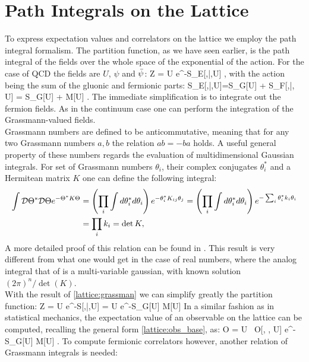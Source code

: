 \section{Path Integrals on the Lattice}
\label{sec:pathintegral}
To express expectation values and correlators on the lattice we employ the path integral formalism. The partition function, as we have seen earlier, is the path integral of the fields over the whole space of the exponential of the action. For the case of QCD the fields are $U$, $\psi$ and $\bar{\psi}$:
\beq
	Z = \int \D\psi\D\bpsi\D U e^{-S_E[\psi,\bar{\psi},U] }  ,
\eeq
with the action being the sum of the gluonic and fermionic parts:
\beq
S_E[\psi,\bar{\psi},U]=S_G[U] + S_F[\psi,\bar{\psi}, U] = S_G[U] + \bpsi M[U] \psi.
\eeq
The immediate simplification is to integrate out the fermion fields. As in the continuum case one can perform the integration of the Grassmann-valued fields. \\
Grassmann numbers are defined to be anticommutative, meaning that for any two Grassmann numbers $a,b$ the relation $ab=-ba$ holds. A useful general property of these numbers regards the evaluation of multidimensional Gaussian integrals. For set of Grassmann numbers $\theta_i$, their complex conjugates $\theta_i^*$ and a Hermitean matrix $K$ one can define the following integral:
\begin{align}
    \label{lattice:grassman}
    \int \mathcal{D}\Theta^*\mathcal{D}\Theta e^{-\Theta^* K \Theta } &= \left( \prod_i\int d\theta_i^*d\theta_i \right)  e^{-\theta_i^* K_{ij} \theta_j } =  \left( \prod_i\int d\theta_i^*d\theta_i \right)  e^{-\sum_i\theta_i^* k_i \theta_i } \\\nonumber
    &= \prod_i k_i = \det K,
\end{align} 
A more detailed proof of this relation can be found in \cite{peskin}. This result is very different from what one would get in the case of real numbers, where the analog integral that of is a multi-variable gaussian, with known solution $(2\pi)^n/\det (K)$. \\
With the result of \cref{lattice:grassman} we can simplify greatly the partition function:
\beq
	Z = \int \D\psi\D\bpsi\D U e^{-S[\psi,\bar{\psi},U] }  = \int \D U e^{-S_G[U] } \det M[U] 
\eeq
In a similar fashion as in statistical mechanics, the expectation value of an observable on the lattice can be computed, recalling the general form \cref{lattice:obs_base}, as:
\beq
    \langle O \rangle =   \int \D U ~O[\psi, \bpsi, U] e^{-S_G[U] } \det M[U] .
    \label{lattice:expectation}
\eeq
To compute fermionic correlators however, another relation of Grassmann integrals is needed:
